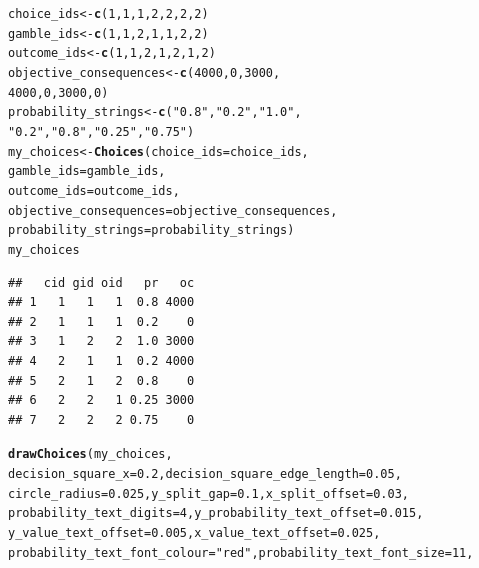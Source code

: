 \documentclass{article}\usepackage[]{graphicx}\usepackage[]{color}
\makeatletter
\newcommand{\hlnum}[1]{\textcolor[rgb]{0.686,0.059,0.569}{#1}}%
\newcommand{\hlstr}[1]{\textcolor[rgb]{0.192,0.494,0.8}{#1}}%
\newcommand{\hlstd}[1]{\textcolor[rgb]{0.345,0.345,0.345}{#1}}%
\newcommand{\hlkwb}[1]{\textcolor[rgb]{0.69,0.353,0.396}{#1}}%
\newcommand{\hlkwc}[1]{\textcolor[rgb]{0.333,0.667,0.333}{#1}}%
\newcommand{\hlkwd}[1]{\textcolor[rgb]{0.737,0.353,0.396}{\textbf{#1}}}%
\newenvironment{kframe}{%
 \def\at@end@of@kframe{}%
 \ifinner\ifhmode%
  \def\at@end@of@kframe{\end{minipage}}%
  \begin{minipage}{\columnwidth}%
 \fi\fi%
 \def\FrameCommand##1{\hskip\@totalleftmargin \hskip-\fboxsep
 \colorbox{shadecolor}{##1}\hskip-\fboxsep
     \hskip-\linewidth \hskip-\@totalleftmargin \hskip\columnwidth}%
 \MakeFramed {\advance\hsize-\width
   \@totalleftmargin\z@ \linewidth\hsize
   \@setminipage}}%
 {\par\unskip\endMakeFramed%
 \at@end@of@kframe}
\newenvironment{knitrout}{}{} %
\makeatother
\begin{document}
\begin{knitrout}
\color{fgcolor}\begin{kframe}
\begin{alltt}
\hlstd{choice_ids} \hlkwb{<-} \hlkwd{c}\hlstd{(}\hlnum{1}\hlstd{,} \hlnum{1}\hlstd{,} \hlnum{1}\hlstd{,} \hlnum{2}\hlstd{,} \hlnum{2}\hlstd{,} \hlnum{2}\hlstd{,} \hlnum{2}\hlstd{)}
\hlstd{gamble_ids} \hlkwb{<-} \hlkwd{c}\hlstd{(}\hlnum{1}\hlstd{,} \hlnum{1}\hlstd{,} \hlnum{2}\hlstd{,} \hlnum{1}\hlstd{,} \hlnum{1}\hlstd{,} \hlnum{2}\hlstd{,} \hlnum{2}\hlstd{)}
\hlstd{outcome_ids} \hlkwb{<-} \hlkwd{c}\hlstd{(}\hlnum{1}\hlstd{,} \hlnum{1}\hlstd{,} \hlnum{2}\hlstd{,} \hlnum{1}\hlstd{,} \hlnum{2}\hlstd{,} \hlnum{1}\hlstd{,} \hlnum{2}\hlstd{)}
\hlstd{objective_consequences} \hlkwb{<-} \hlkwd{c}\hlstd{(}\hlnum{4000}\hlstd{,} \hlnum{0}\hlstd{,} \hlnum{3000}\hlstd{,}
        \hlnum{4000}\hlstd{,} \hlnum{0}\hlstd{,} \hlnum{3000}\hlstd{,} \hlnum{0}\hlstd{)}
\hlstd{probability_strings} \hlkwb{<-} \hlkwd{c}\hlstd{(}\hlstr{"0.8"}\hlstd{,} \hlstr{"0.2"}\hlstd{,} \hlstr{"1.0"}\hlstd{,}
        \hlstr{"0.2"}\hlstd{,} \hlstr{"0.8"}\hlstd{,} \hlstr{"0.25"}\hlstd{,} \hlstr{"0.75"}\hlstd{)}
\hlstd{my_choices} \hlkwb{<-} \hlkwd{Choices}\hlstd{(}\hlkwc{choice_ids}\hlstd{=choice_ids,}
        \hlkwc{gamble_ids}\hlstd{=gamble_ids,}
        \hlkwc{outcome_ids}\hlstd{=outcome_ids,}
        \hlkwc{objective_consequences}\hlstd{=objective_consequences,}
        \hlkwc{probability_strings}\hlstd{=probability_strings)}
\hlstd{my_choices}
\end{alltt}
\begin{verbatim}
##   cid gid oid   pr   oc
## 1   1   1   1  0.8 4000
## 2   1   1   1  0.2    0
## 3   1   2   2  1.0 3000
## 4   2   1   1  0.2 4000
## 5   2   1   2  0.8    0
## 6   2   2   1 0.25 3000
## 7   2   2   2 0.75    0
\end{verbatim}
\begin{alltt}
\hlkwd{drawChoices}\hlstd{(my_choices,}
        \hlkwc{decision_square_x}\hlstd{=}\hlnum{0.2}\hlstd{,} \hlkwc{decision_square_edge_length}\hlstd{=}\hlnum{0.05}\hlstd{,}
        \hlkwc{circle_radius}\hlstd{=}\hlnum{0.025}\hlstd{,} \hlkwc{y_split_gap}\hlstd{=}\hlnum{0.1}\hlstd{,} \hlkwc{x_split_offset}\hlstd{=}\hlnum{0.03}\hlstd{,}
        \hlkwc{probability_text_digits}\hlstd{=}\hlnum{4}\hlstd{,} \hlkwc{y_probability_text_offset}\hlstd{=}\hlnum{0.015}\hlstd{,}
        \hlkwc{y_value_text_offset}\hlstd{=}\hlnum{0.005}\hlstd{,} \hlkwc{x_value_text_offset}\hlstd{=}\hlnum{0.025}\hlstd{,}
        \hlkwc{probability_text_font_colour}\hlstd{=}\hlstr{"red"}\hlstd{,} \hlkwc{probability_text_font_size}\hlstd{=}\hlnum{11}\hlstd{,}

\end{alltt}
\end{kframe}
\end{knitrout}
\end{document}
